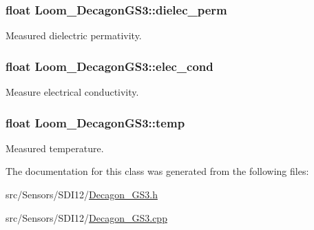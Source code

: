 \subsubsection[{\texorpdfstring{dielec\+\_\+perm}{dielec_perm}}]{\setlength{\rightskip}{0pt plus 5cm}float Loom\+\_\+\+Decagon\+G\+S3\+::dielec\+\_\+perm\hspace{0.3cm}{\ttfamily [protected]}}\hypertarget{class_loom___decagon_g_s3_a4d980a6c88cf7eeed2594c1651a439dd}{}\label{class_loom___decagon_g_s3_a4d980a6c88cf7eeed2594c1651a439dd}


Measured dielectric permativity. 

\subsubsection[{\texorpdfstring{elec\+\_\+cond}{elec_cond}}]{\setlength{\rightskip}{0pt plus 5cm}float Loom\+\_\+\+Decagon\+G\+S3\+::elec\+\_\+cond\hspace{0.3cm}{\ttfamily [protected]}}\hypertarget{class_loom___decagon_g_s3_a707a1d557e8b5eaa55202b45d369a350}{}\label{class_loom___decagon_g_s3_a707a1d557e8b5eaa55202b45d369a350}


Measure electrical conductivity. 

\subsubsection[{\texorpdfstring{temp}{temp}}]{\setlength{\rightskip}{0pt plus 5cm}float Loom\+\_\+\+Decagon\+G\+S3\+::temp\hspace{0.3cm}{\ttfamily [protected]}}\hypertarget{class_loom___decagon_g_s3_a24b5b1b72e6754add3768d4596832026}{}\label{class_loom___decagon_g_s3_a24b5b1b72e6754add3768d4596832026}


Measured temperature. 



The documentation for this class was generated from the following files\+:\begin{DoxyCompactItemize}
\item 
src/\+Sensors/\+S\+D\+I12/\hyperlink{_decagon___g_s3_8h}{Decagon\+\_\+\+G\+S3.\+h}\item 
src/\+Sensors/\+S\+D\+I12/\hyperlink{_decagon___g_s3_8cpp}{Decagon\+\_\+\+G\+S3.\+cpp}\end{DoxyCompactItemize}

